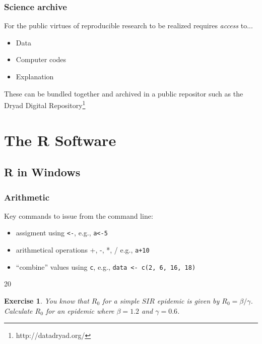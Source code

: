 \documentclass[10pt]{beamer}
\newcommand{\code}[1]{\texttt{#1}}
\theoremstyle{exercise}
\newtheorem{exercise}{Exercise}
\begin{document}
\begin{frame}[fragile]
  \frametitle{Science archive}
  
{\Large For the public virtues of reproducible research to be realized requires \textit{access} to...}

\vspace{5mm}
  
\begin{itemize}
  \item Data
  \item Computer codes
  \item Explanation
\end{itemize}

\vspace{3mm}

These can be bundled together and archived in a public repositor such as the Dryad Digital Repository\footnote{http://datadryad.org/}
  
\end{frame}
\section{The R Software}
\subsection{R in Windows}


\begin{frame}[fragile]
  \frametitle{Arithmetic}
  
Key commands to issue from the command line:
\begin{itemize}
  \item assigment using \code{<-}, e.g., \code{a<-5}
  \item arithmetical operations +, -, *, /  e.g., \code{a+10}
  \item ``combine'' values using \code{c}, e.g., \code{data <- c(2, 6, 16, 18)}
\end{itemize}

\begin{Schunk}
\begin{Soutput}
[1] 20
\end{Soutput}
\end{Schunk}

\begin{exercise}
  You know that $R_0$ for a simple $SIR$ epidemic is given by $R_0=\beta / \gamma$. Calculate $R_0$ for an epidemic where $\beta=1.2$ and $\gamma=0.6$.
\end{exercise}

\end{frame}
\end{document}
